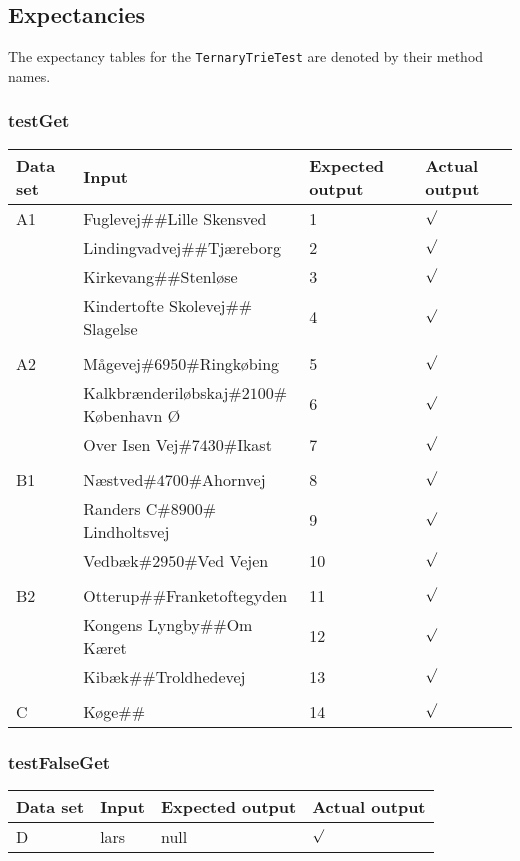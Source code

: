 \pagebreak
\subsection{Expectancies}
The expectancy tables for the \texttt{TernaryTrieTest} are denoted by their method names.

\subsubsection*{testGet}
\begin{tabular}{ p{1.5cm} | p{8cm} | p{2cm} | p{1cm} }
	\textbf{Data set} & \textbf{Input} & \textbf{Expected output} & \textbf{Actual output} \\	
	\hline
	A1 & Fuglevej$\#\#$Lille Skensved & 1 & $\surd$ \\
	& Lindingvadvej$\#\#$Tj\ae reborg & 2 & $\surd$ \\
	& Kirkevang$\#\#$Stenl\o se & 3 & $\surd$ \\
	& Kindertofte Skolevej$\#\#$Slagelse & 4 & $\surd$ \\
	&&&\\	
	A2 & M\aa gevej$\#6950\#$Ringk\o bing & 5 & $\surd$ \\
	& Kalkbr\ae nderil\o bskaj$\#2100\#$K\o benhavn \O  & 6 & $\surd$ \\
	& Over Isen Vej$\#7430\#$Ikast & 7 & $\surd$ \\
	&&&\\
	B1 & N\ae stved$\#4700\#$Ahornvej & 8 & $\surd$ \\
	& Randers C$\#8900\#$Lindholtsvej & 9 & $\surd$ \\
	& Vedb\ae k$\#2950\#$Ved Vejen & 10 & $\surd$ \\
	&&&\\
	B2 & Otterup$\#\#$Franketoftegyden & 11 & $\surd$ \\
	& Kongens Lyngby$\#\#$Om K\ae ret & 12 & $\surd$ \\
	& Kib\ae k$\#\#$Troldhedevej & 13 & $\surd$ \\
	&&&\\
	C & K\o ge$\#\#$ & 14 & $\surd$ \\
\end{tabular}

\subsubsection*{testFalseGet}
\begin{tabular}{ p{1.5cm} | p{8cm} | p{2cm} | p{1cm} }
	\textbf{Data set} & \textbf{Input} & \textbf{Expected output} & \textbf{Actual output} \\	
	\hline
	D & lars & null & $\surd$
\end{tabular}
\pagebreak

